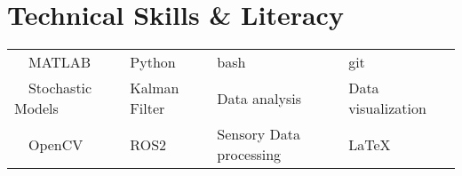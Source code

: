 \section{Technical Skills \& Literacy}
%
%
\begin{tabularx}{1.0\textwidth} { X L L R }

$\> \> \>$    MATLAB	            & Python             & bash                     & git    \\
$\> \> \>$	  Stochastic Models  & Kalman Filter      & Data analysis            & Data visualization    \\
$\> \> \>$	  OpenCV 			   & ROS2               & Sensory Data processing  & \LaTeX 
\end{tabularx}